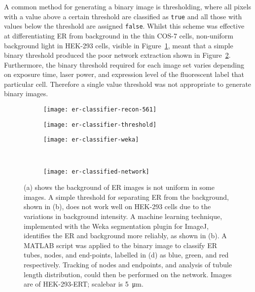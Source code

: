 A common method for generating a binary image is thresholding, where all pixels with a value above a certain threshold are classified as \texttt{true} and all those with values below the threshold are assigned \texttt{false}. 
Whilst this scheme was effective at differentiating ER from background in the thin COS-7 cells, non-uniform background light in HEK-293 cells, visible in Figure~\ref{fig:er-classifier-recon-561}, meant that a simple binary threshold produced the poor network extraction shown in Figure~\ref{fig:ER-classifier-threshold}. 
Furthermore, the binary threshold required for each image set varies depending on exposure time, laser power, and expression level of the fluorescent label that particular cell. 
Therefore a single value threshold was not appropriate to generate binary images.  

\begin{figure}[p!]
	\centering
	\begin{subfigure}[b]{0.325\textwidth}
		\texttt{[image: er-classifier-recon-561]}
		\caption{} \label{fig:er-classifier-recon-561}
	\end{subfigure}	
	\hfill
	\begin{subfigure}[b]{0.325\textwidth}
		\texttt{[image: er-classifier-threshold]}
		\caption{} \label{fig:ER-classifier-threshold}
	\end{subfigure}	
	\hfill
	\begin{subfigure}[b]{0.325\textwidth}
		\texttt{[image: er-classifier-weka]}
		\caption{} \label{fig:ER-classifier-weka}
	\end{subfigure}	

	~\newline
	\begin{subfigure}[b]{0.8\textwidth}
		\texttt{[image: er-classified-network]}
		\caption{} \label{fig:er-classified-network}
	\end{subfigure}
	\caption[ER: Weka segmentation allows the ER network to be extracted from a non-uniform background]{(a) shows the background of ER images is not uniform in some images. A simple threshold for separating ER from the background, shown in (b), does not work well on HEK-293 cells due to the variations in background intensity. A machine learning technique, implemented with the Weka segmentation plugin for ImageJ, identifies the ER and background more reliably, as shown in (b). A MATLAB script was applied to the binary image to classify ER tubes, nodes, and end-points, labelled in (d) as blue, green, and red respectively. Tracking of nodes and endpoints, and analysis of tubule length distribution, could then be performed on the network. Images are of HEK-293-ERT; scalebar is \SI{5}{\micro\metre}. } 
	\label{fig:ER-classifier}
\end{figure}


